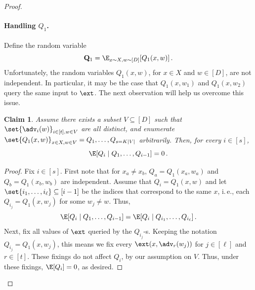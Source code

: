 \documentclass[11pt]{article}
\numberwithin{equation}{section}
\newtheorem{claim}[theorem]{Claim}
\theoremstyle{definition}
\theoremstyle{plain}
\newcommand{\ie}{i.\,e.}
\begin{document}
\begin{proof}
\paragraph{Handling $Q_1$.} Define the random variable
\[
\mathbf{Q}_1 = \E_{x \sim X,w \sim [D]}[Q_{1}(x,w)]\,.
\]
Unfortunately, the random variables $Q_{1}(x,w)$, 
for $x \in X$ and
$w \in [D]$, are not independent. In particular, it may be the case that $Q_1(x,w_1)$
and $Q_1(x,w_2)$ query the same input to $\ext$.
The next observation will help us overcome
this issue.
\begin{claim}\label{claim:partition}
Assume there exists a subset $V \subseteq [D]$ such that 
$\set{\adv_{i}(w)}_{i \in [t],w \in V}$ are all distinct, and enumerate
$\set{Q_1(x,w)}_{x \in X,w \in V} = Q_{1},\ldots,Q_{s = K|V|}$ arbitrarily. Then, for every $i \in [s]$,
\[\E[Q_{i} \mid Q_{1},\ldots,Q_{i-1}]=0\,.\]
\end{claim}
\begin{proof}
Fix $i \in [s]$.
First note that for $x_a \neq x_b$, $Q_{a} = Q_1(x_a,w_a)$ and $Q_{b} = Q_1(x_b,w_b)$ 
are independent. Assume that $Q_i = Q_{1}(x,w)$
and let $\set{i_1,\ldots,i_\ell} \subseteq [i-1]$ be the indices that correspond to the same $x$,
\ie, each $Q_{i_j} = Q_{1}(x,w_j)$ for some $w_j \neq w$. Thus,
\[\E[Q_{i} \mid Q_{1},\ldots,Q_{i-1}]=\E[Q_{i} \mid Q_{i_1},\ldots,Q_{i_\ell}]\,.\]
Next, fix all values of $\ext$ queried by the $Q_{i_j}$-s. Keeping the notation
$Q_{i_j} = Q_1(x,w_j)$, this means we fix every
$\ext(x,\adv_{r}(w_j))$ for $j \in [\ell]$ and $r \in [t]$. These fixings do not
affect $Q_i$, by our assumption on $V$. Thus, under these fixings, $\E[Q_i] = 0$, 
as desired.
\end{proof}


\end{proof}
\end{document}

